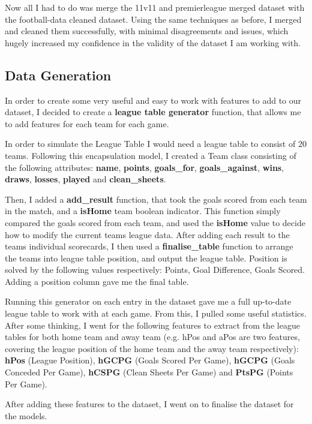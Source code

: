 \documentclass[12pt,a4paper,twoside,openright]{report}
\begin{document}
Now all I had to do was merge the 11v11 and premierleague merged dataset with the football-data cleaned dataset. Using the same techniques as before, I merged and cleaned them successfully, with minimal disagreements and issues, which hugely increased my confidence in the validity of the dataset I am working with.

\subsection{Data Generation}

In order to create some very useful and easy to work with features to add to our dataset, I decided to create a \textbf{league table generator} function, that allows me to add features for each team for each game. 

In order to simulate the League Table I would need a league table to consist of 20 teams. Following this encapsulation model, I created a Team class consisting of the following attributes: \textbf{name}, \textbf{points}, \textbf{goals\_for}, \textbf{goals\_against}, \textbf{wins}, \textbf{draws}, \textbf{losses}, \textbf{played} and \textbf{clean\_sheets}.

Then, I added a \textbf{add\_result} function, that took the goals scored from each team in the match, and a \textbf{isHome} team boolean indicator. This function simply compared the goals scored from each team, and used the \textbf{isHome} value to decide how to modify the current teams league data. After adding each result to the teams individual scorecards, I then used a \textbf{finalise\_table} function to arrange the teams into league table position, and output the league table. Position is solved by the following values respectively: Points, Goal Difference, Goals Scored. Adding a position column gave me the final table.

Running this generator on each entry in the dataset gave me a full up-to-date league table to work with at each game. From this, I pulled some useful statistics. After some thinking, I went for the following features to extract from the league tables for both home team and away team (e.g. hPos and aPos are two features, covering the league position of the home team and the away team respectively): \textbf{hPos} (League Position), \textbf{hGCPG} (Goals Scored Per Game), \textbf{hGCPG} (Goals Conceded Per Game), \textbf{hCSPG} (Clean Sheets Per Game) and \textbf{PtsPG} (Points Per Game).

After adding these features to the dataset, I went on to finalise the dataset for the models.
\end{document}
